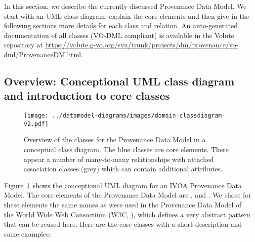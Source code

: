 % 
In this section, we describe the currently discussed Provenance Data Model. We 
start with an UML class diagram, explain the core elements and then give 
in the following sections more details for each class and relation.
An auto-generated documentation of all classes (VO-DML compliant) is available in the Volute repository at \url{https://volute.g-vo.org/svn/trunk/projects/dm/provenance/vo-dml/ProvenanceDM.html}.

\subsection{Overview: Conceptional UML class diagram and introduction to core classes}

\begin{figure}[h]
\centering
\texttt{[image: ../datamodel-diagrams/images/domain-classdiagram-v2.pdf]}
\caption[Overview: conceptual class diagram of the Provenance Data Model]{Overview of the classes for the Provenance Data Model in a conceptual class diagram. The blue classes are core elements. There appear a number of many-to-many relationships with attached association classes (grey) which can contain additional attributes.}
\label{fig:classdiagram-conceptional}
\end{figure}



Figure~\ref{fig:classdiagram-conceptional} shows the conceptional UML diagram for an IVOA Provenance Data
Model.
The core elements of the Provenance Data Model are ,  and . 
We chose for these elements the same names as were used in the Provenance Data 
Model of the World Wide Web Consortium (W3C, \citealt{std:W3CProvDM}), which defines 
a very abstract pattern that can be reused here. Here are the core classes with 
a short description and some examples:


